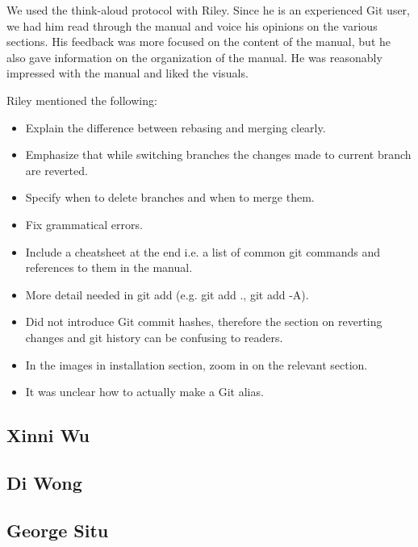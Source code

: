 \documentclass[11pt]{article}
\begin{document}
We used the think-aloud protocol with Riley. Since he is an experienced Git user, we had him read through the manual and voice his opinions on the various sections. His feedback was more focused on the content of the manual, but he also gave information on the organization of the manual. He was reasonably impressed with the manual and liked the visuals.

Riley mentioned the following:
\begin{itemize}
	\item Explain the difference between rebasing and merging clearly.
	\item Emphasize that while switching branches the changes made to current branch are
	reverted.
	\item Specify when to delete branches and when to merge them.
	\item Fix grammatical errors.
	\item Include a cheatsheet at the end i.e. a list of common git commands and
	references to them in the manual.
	\item More detail needed in git add (e.g. git add ., git add -A).
	\item Did not introduce Git commit hashes, therefore the section on reverting 
	changes and git history can be confusing to readers.
	\item In the images in installation section, zoom in on the relevant section.
	\item It was unclear how to actually make a Git alias.
	
\end{itemize}

\subsection*{Xinni Wu}

\subsection*{Di Wong}

\subsection*{George Situ}
\end{document}
